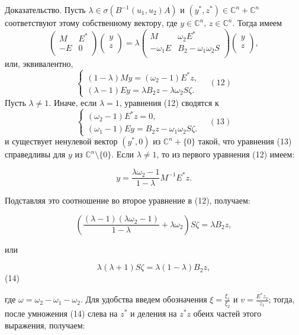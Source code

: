 \documentclass{article}
\begin{document}
Доказательство. Пусть \( \lambda \in \sigma(B^{-1}(u_1, u_2)A) \) и \( (y^*, z^*) \in \mathbb{C}^n + \mathbb{C}^n \) соответствуют этому собственному вектору, где \( y \in \mathbb{C}^n \), \( z \in \mathbb{C}^n \). Тогда имеем
\[
\begin{pmatrix}
M & E^* \\
-E & 0 \\
\end{pmatrix}
\begin{pmatrix}
y \\
z \\
\end{pmatrix}
= \lambda
\begin{pmatrix}
M & \omega_2E^* \\
-\omega_1E & B_2 - \omega_1\omega_2S \\
\end{pmatrix}
\begin{pmatrix}
y \\
z \\
\end{pmatrix},
\]
или, эквивалентно,
\[
\begin{cases}
(1 - \lambda)My = (\omega_2 - 1)E^*z, \\
(\lambda - 1)Ey = \lambda B_2z - \lambda\omega_2S\zeta.
\end{cases}
\quad (12)
\]
Пусть \( \lambda \neq 1 \). Иначе, если \( \lambda = 1 \), уравнения (12) сводятся к
\[
\begin{cases}
(\omega_2 - 1)E^*z = 0, \\
(\omega_1 - 1)Ey = B_2z - \omega_1\omega_2S\zeta.
\end{cases}
\quad (13)
\]
и существует ненулевой вектор \( (y^*, 0) \) из \( \mathbb{C}^n + \{0\} \) такой, что уравнения (13) справедливы для \( y \) из \( \mathbb{C}^n \setminus \{0\} \). Если \( \lambda \neq 1 \), то из первого уравнения (12) имеем:

\[
y = \frac{\lambda \omega_2 - 1}{1 - \lambda} M^{-1}E^*z.
\]

Подставляя это соотношение во второе уравнение в (12), получаем:

\[
\left( \frac{(\lambda - 1)(\lambda \omega_2 - 1)}{1 - \lambda} + \lambda \omega_2 \right) S\zeta = \lambda B_2z,
\]

или

\[
\lambda (\lambda + 1) S\zeta = \lambda (1 - \lambda) B_2z,
\]
(14)

где \( \omega = \omega_2 - \omega_1 - \omega_2 \). Для удобства введем обозначения \( \xi = \frac{\xi_1}{\xi_2} \) и \( v = \frac{E^*z_2}{z_1} \); тогда, после умножения (14) слева на \( z^* \) и деления на \( z^*z \) обеих частей этого выражения, получаем:
\end{document}
